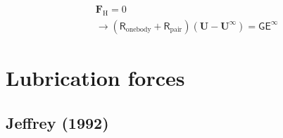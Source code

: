 \documentclass[12pt]{article}
\newcommand{\tens}[1]{\bm{\mathsf{#1}}}
\begin{document}
\begin{align*}
  &\bm{F}_{\mathrm{H}} = 0 \\
  & \rightarrow
  (\tens{R}_{\mathrm{onebody}} + \tens{R}_{\mathrm{pair}})(\bm{U}-\bm{U}^{\infty})  
  =  \tens{G} \tens{E}^{\infty}  
\end{align*}



\newpage

\section{Lubrication forces}

\subsection*{Jeffrey (1992)}
\end{document}
